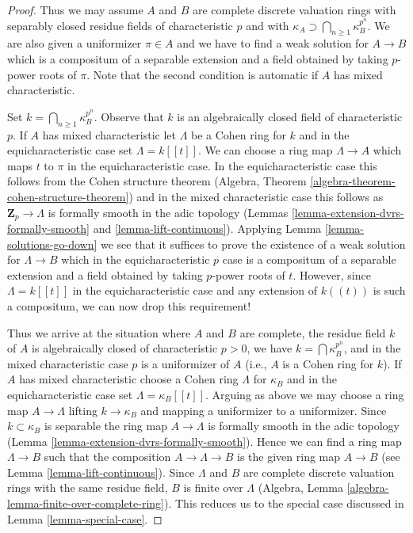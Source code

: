 \begin{proof}
\medskip\noindent
Thus we may assume $A$ and $B$ are complete discrete valuation rings
with separably closed residue fields of characteristic $p$ and
with $\kappa_A \supset \bigcap\nolimits_{n \geq 1} \kappa_B^{p^n}$.
We are also given a uniformizer $\pi \in A$ and we have to find a
weak solution for $A \to B$ which is a compositum of a separable
extension and a field obtained by taking $p$-power roots of $\pi$.
Note that the second condition is automatic if $A$ has mixed characteristic.

\medskip\noindent
Set $k = \bigcap\nolimits_{n \geq 1} \kappa_B^{p^n}$.
Observe that $k$ is an algebraically closed field of characteristic $p$.
If $A$ has mixed characteristic let $\Lambda$ be a Cohen
ring for $k$ and in the equicharacteristic case set $\Lambda = k[[t]]$.
We can choose a ring map $\Lambda \to A$ which maps $t$ to $\pi$ in the
equicharacteristic case. In the equicharacteristic case this follows
from the Cohen structure theorem
(Algebra, Theorem \ref{algebra-theorem-cohen-structure-theorem}) and
in the mixed characteristic case this follows as
$\mathbf{Z}_p \to \Lambda$ is formally smooth in the adic topology
(Lemmas \ref{lemma-extension-dvrs-formally-smooth} and
\ref{lemma-lift-continuous}).
Applying Lemma \ref{lemma-solutions-go-down} we see that it suffices to prove
the existence of a weak solution for $\Lambda \to B$ which in
the equicharacteristic $p$ case is a compositum of a separable
extension and a field obtained by taking $p$-power roots of $t$.
However, since $\Lambda = k[[t]]$ in the equicharacteristic case
and any extension of $k((t))$ is such a compositum, we can now
drop this requirement!

\medskip\noindent
Thus we arrive at the situation where $A$ and $B$ are complete, the residue
field $k$ of $A$ is algebraically closed of characteristic $p > 0$,
we have $k = \bigcap \kappa_B^{p^n}$, and in the mixed characteristic
case $p$ is a uniformizer of $A$ (i.e., $A$ is a Cohen ring for $k$).
If $A$ has mixed characteristic choose a Cohen ring
$\Lambda$ for $\kappa_B$ and in the equicharacteristic case set
$\Lambda = \kappa_B[[t]]$. Arguing as above we may choose a ring map
$A \to \Lambda$ lifting $k \to \kappa_B$ and mapping a uniformizer
to a uniformizer. Since $k \subset \kappa_B$ is separable the ring
map $A \to \Lambda$ is formally smooth in the adic topology
(Lemma \ref{lemma-extension-dvrs-formally-smooth}). Hence
we can find a ring map $\Lambda \to B$ such that the composition
$A \to \Lambda \to B$ is the given ring map $A \to B$ (see
Lemma \ref{lemma-lift-continuous}).
Since $\Lambda$ and $B$ are complete discrete valuation rings with the same
residue field, $B$ is finite over $\Lambda$
(Algebra, Lemma \ref{algebra-lemma-finite-over-complete-ring}).
This reduces us to the special case discussed in
Lemma \ref{lemma-special-case}.
\end{proof}

